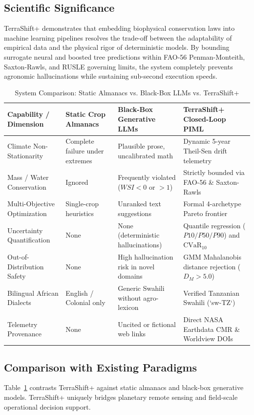 \documentclass[10pt,twocolumn]{article}
\begin{document}
\subsection{Scientific Significance}
TerraShift+ demonstrates that embedding biophysical conservation laws into machine learning pipelines resolves the trade-off between the adaptability of empirical data and the physical rigor of deterministic models. By bounding surrogate neural and boosted tree predictions within FAO-56 Penman-Monteith, Saxton-Rawls, and RUSLE governing limits, the system completely prevents agronomic hallucinations while sustaining sub-second execution speeds.

\begin{table}[t]
\centering
\caption{System Comparison: Static Almanacs vs. Black-Box LLMs vs. TerraShift+}
\label{tab:system_comparison}
\small
\begin{tabularx}{\textwidth}{lXXX}
\toprule
\textbf{Capability / Dimension} & \textbf{Static Crop Almanacs} & \textbf{Black-Box Generative LLMs} & \textbf{TerraShift+ Closed-Loop PIML} \\
\midrule
Climate Non-Stationarity & Complete failure under extremes & Plausible prose, uncalibrated math & Dynamic 5-year Theil-Sen drift telemetry \\
Mass / Water Conservation & Ignored & Frequently violated ($WSI < 0$ or $>1$) & Strictly bounded via FAO-56 \& Saxton-Rawls \\
Multi-Objective Optimization & Single-crop heuristics & Unranked text suggestions & Formal 4-archetype Pareto frontier \\
Uncertainty Quantification & None & None (deterministic hallucinations) & Quantile regression ($P10/P50/P90$) and $\text{CVaR}_{10}$ \\
Out-of-Distribution Safety & None & High hallucination risk in novel domains & GMM Mahalanobis distance rejection ($D_M > 5.0$) \\
Bilingual African Dialects & English / Colonial only & Generic Swahili without agro-lexicon & Verified Tanzanian Swahili (`sw-TZ`) \\
Telemetry Provenance & None & Uncited or fictional web links & Direct NASA Earthdata CMR \& Worldview DOIs \\
\bottomrule
\end{tabularx}
\end{table}

\subsection{Comparison with Existing Paradigms}
Table~\ref{tab:system_comparison} contrasts TerraShift+ against static almanacs and black-box generative models. TerraShift+ uniquely bridges planetary remote sensing and field-scale operational decision support.
\end{document}
